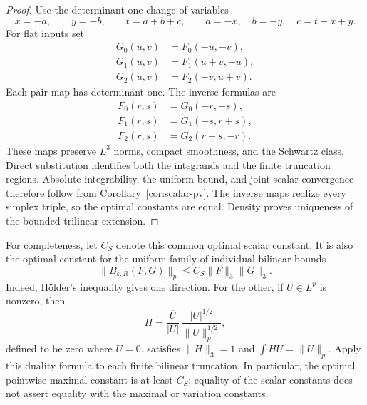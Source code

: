 \begin{proof}
Use the determinant-one change of variables
\[
 x=-a,\qquad y=-b,\qquad t=a+b+c,
 \qquad
 a=-x,\quad b=-y,\quad c=t+x+y.
\]
For flat inputs set
\[
 \begin{aligned}
 G_0(u,v)&=F_0(-u,-v),\\
 G_1(u,v)&=F_1(u+v,-u),\\
 G_2(u,v)&=F_2(-v,u+v).
 \end{aligned}
\]
Each pair map has determinant one. The inverse formulas are
\[
 \begin{aligned}
 F_0(r,s)&=G_0(-r,-s),\\
 F_1(r,s)&=G_1(-s,r+s),\\
 F_2(r,s)&=G_2(r+s,-r).
 \end{aligned}
\]
These maps preserve $L^3$ norms, compact smoothness, and the Schwartz
class. Direct substitution identifies both the integrands and the
finite truncation regions. Absolute integrability, the uniform bound,
and joint scalar convergence therefore follow from
Corollary~\ref{cor:scalar-pv}. The inverse maps realize every simplex
triple, so the optimal constants are equal. Density proves uniqueness
of the bounded trilinear extension.
\end{proof}

For completeness, let $C_S$ denote this common optimal scalar constant.
It is also the optimal constant for the uniform family of individual
bilinear bounds
\[
 \|B_{\varepsilon,R}(F,G)\|_p
 \le C_S\|F\|_3\|G\|_3.
\]
Indeed, H\"older's inequality gives one direction. For the other, if
$U\in L^p$ is nonzero, then
\[
 H=\frac{\overline U}{|U|}\,
       \frac{|U|^{1/2}}{\|U\|_p^{1/2}},
\]
defined to be zero where $U=0$, satisfies $\|H\|_3=1$ and
$\int HU=\|U\|_p$. Apply this duality formula to each finite bilinear
truncation. In particular, the optimal pointwise maximal constant is
at least $C_S$; equality of the scalar constants does not assert
equality with the maximal or variation constants.
